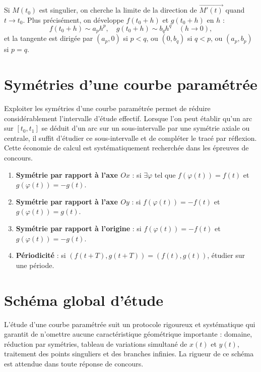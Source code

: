 \documentclass[11pt,a4paper,twoside]{book}
\begin{document}
\begin{definitionbox}
Si $M(t_0)$ est singulier, on cherche la limite de la direction de $\overrightarrow{M'(t)}$ quand $t \to t_0$.
Plus précisément, on développe $f(t_0+h)$ et $g(t_0+h)$ en $h$ :
\[
  f(t_0+h) \sim a_p h^p, \quad g(t_0+h) \sim b_q h^q \quad (h \to 0),
\]
et la tangente est dirigée par $(a_p, 0)$ si $p < q$, ou $(0, b_q)$ si $q < p$, ou $(a_p, b_p)$ si $p = q$.
\end{definitionbox}

\section{Symétries d'une courbe paramétrée}

Exploiter les symétries d'une courbe paramétrée permet de réduire considérablement l'intervalle d'étude effectif. Lorsque l'on peut établir qu'un arc sur $[t_0, t_1]$ se déduit d'un arc sur un sous-intervalle par une symétrie axiale ou centrale, il suffit d'étudier ce sous-intervalle et de compléter le tracé par réflexion. Cette économie de calcul est systématiquement recherchée dans les épreuves de concours.

\begin{methodebox}
\begin{enumerate}
  \item \textbf{Symétrie par rapport à l'axe $Ox$} : si $\exists \varphi$ tel que $f(\varphi(t)) = f(t)$ et $g(\varphi(t)) = -g(t)$.
  \item \textbf{Symétrie par rapport à l'axe $Oy$} : si $f(\varphi(t)) = -f(t)$ et $g(\varphi(t)) = g(t)$.
  \item \textbf{Symétrie par rapport à l'origine} : si $f(\varphi(t)) = -f(t)$ et $g(\varphi(t)) = -g(t)$.
  \item \textbf{Périodicité} : si $(f(t+T), g(t+T)) = (f(t), g(t))$, étudier sur une période.
\end{enumerate}
\end{methodebox}

\section{Schéma global d'étude}

L'étude d'une courbe paramétrée suit un protocole rigoureux et systématique qui garantit de n'omettre aucune caractéristique géométrique importante : domaine, réduction par symétries, tableau de variations simultané de $x(t)$ et $y(t)$, traitement des points singuliers et des branches infinies. La rigueur de ce schéma est attendue dans toute réponse de concours.
\end{document}
